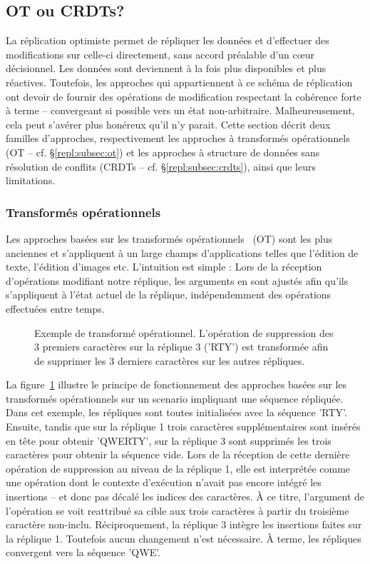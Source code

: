 
\subsection{OT ou CRDTs?}
\label{repl:subsec:otorcrdts}

La réplication optimiste permet de répliquer les données et d'effectuer des
modifications sur celle-ci directement, sans accord préalable d'un cœur
décisionnel. Les données sont deviennent à la fois plus disponibles et plus
réactives. Toutefois, les approches qui appartiennent à ce schéma de réplication
ont devoir de fournir des opérations de modification respectant la cohérence
forte à terme -- convergeant si possible vers un état
non-arbitraire. Malheureusement, cela peut s'avérer plus honéreux qu'il n'y
parait. Cette section décrit deux familles d'approches, respectivement les
approches à transformés opérationnels (OT -- cf. §\ref{repl:subsec:ot}) et les
approches à structure de données sans résolution de conflits (CRDTs --
cf. §\ref{repl:subsec:crdts}), ainsi que leurs limitations.

\subsubsection{Transformés opérationnels}
\label{repl:subsubsec:ot}

Les approches basées sur les transformés opérationnels~\cite{sun1998operational,
  sun2009contextbased} (OT) sont les plus anciennes et s'appliquent à un large
champs d'applications telles que l'édition de texte, l'édition d'images
etc. L'intuition est simple : Lors de la réception d'opérations modifiant notre
réplique, les arguments en sont ajustés afin qu'ils s'appliquent à l'état actuel
de la réplique, indépendemment des opérations effectuées entre temps.

\begin{figure}
  \centering
  
  \caption{\label{repl:fig:otexample} Exemple de transformé
    opérationnel. L'opération de suppression des 3 premiers caractères sur la
    réplique 3 ('RTY') est transformée afin de supprimer les 3 derniers caractères
    sur les autres répliques.}
\end{figure}

La figure~\ref{repl:fig:otexample} illustre le principe de fonctionnement des
approches basées sur les transformés opérationnels sur un scenario impliquant
une séquence répliquée. Dans cet exemple, les répliques sont toutes initialisées
avec la séquence 'RTY'. Ensuite, tandis que sur la réplique 1 trois caractères
supplémentaires sont insérés en tête pour obtenir 'QWERTY', sur la réplique 3
sont supprimés les trois caractères pour obtenir la séquence vide. Lors de la
réception de cette dernière opération de suppression au niveau de la réplique 1,
elle est interprétée comme une opération dont le contexte d'exécution n'avait
pas encore intégré les insertions -- et donc pas décalé les indices des
caractères. À ce titre, l'argument de l'opération se voit reattribué sa cible
aux trois caractères à partir du troisième caractère non-inclu. Réciproquement,
la réplique 3 intègre les insertions faites sur la réplique 1. Toutefois aucun
changement n'est nécessaire. À terme, les répliques convergent vers la séquence
'QWE'.

